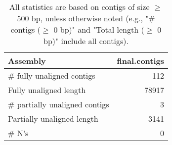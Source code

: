 \documentclass[12pt,a4paper]{article}
\begin{document}
\begin{table}[ht]
\begin{center}
\caption{All statistics are based on contigs of size $\geq$ 500 bp, unless otherwise noted (e.g., "\# contigs ($\geq$ 0 bp)" and "Total length ($\geq$ 0 bp)" include all contigs).}
\begin{tabular}{|l*{1}{|r}|}
\hline
Assembly & final.contigs \\ \hline
\# fully unaligned contigs & 112 \\ \hline
Fully unaligned length & 78917 \\ \hline
\# partially unaligned contigs & 3 \\ \hline
Partially unaligned length & 3141 \\ \hline
\# N's & 0 \\ \hline
\end{tabular}
\end{center}
\end{table}
\end{document}
